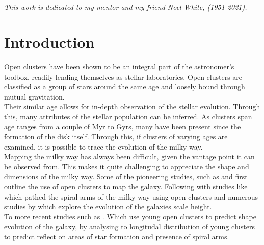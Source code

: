 \section*{}


\begin{center}
    \textit{This work is dedicated to my mentor and my friend Noel White, (1951-2021).}
\end{center}

\section{Introduction} \label{sec:intro}

Open clusters have been shown to be an integral part of the astronomer's toolbox, readily lending themselves as stellar laboratories. Open clusters are classified as a group of stars around the same age and loosely bound through mutual gravitation. \\
Their similar age allows for in-depth observation of the stellar evolution. Through this, many attributes of the stellar population can be inferred. As clusters span age ranges from a couple of Myr to Gyrs, many have been present since the formation of the disk itself. Through this, if clusters of varying ages are examined, it is possible to trace the evolution of the milky way.  \\

Mapping the milky way has always been difficult, given the vantage point it can be observed from. This makes it quite challenging to appreciate the shape and dimensions of the milky way. Some of the pioneering studies, such as \cite{1785RSPT...75..213H,1918ApJ....48..154S} and \cite{1930LicOB..14..154T} first outline the use of open clusters to map the galaxy. Following with studies like \cite{1970IAUS...38..205B} which pathed the spiral arms of the milky way using open clusters and numerous studies by \cite{1958ZA.....46..176V} which explore the evolution of the galaxies scale height. \\

To more recent studies such as \cite{2006Bon}. Which use young open clusters to predict shape evolution of the galaxy, by analysing to longitudal distribution of young clusters to predict reflect on areas of star formation and presence of spiral arms. 

